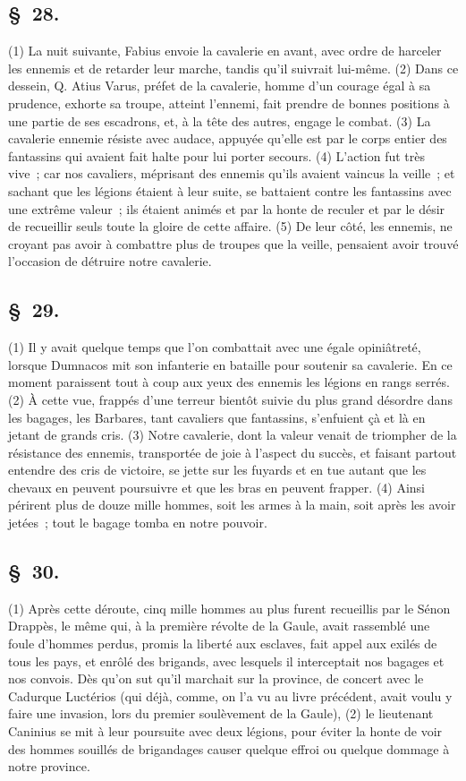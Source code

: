 \documentclass[french,twoside]{book} %
\begin{document}
\subsection[{§ 28.}]{ \textsc{§ 28.} }
\noindent (1) La nuit suivante, Fabius envoie la cavalerie en avant, avec ordre de harceler les ennemis et de retarder leur marche, tandis qu’il suivrait lui-même. (2) Dans ce dessein, Q. Atius Varus, préfet de la cavalerie, homme d’un courage égal à sa prudence, exhorte sa troupe, atteint l’ennemi, fait prendre de bonnes positions à une partie de ses escadrons, et, à la tête des autres, engage le combat. (3) La cavalerie ennemie résiste avec audace, appuyée qu’elle est par le corps entier des fantassins qui avaient fait halte pour lui porter secours. (4) L'action fut très vive ; car nos cavaliers, méprisant des ennemis qu’ils avaient vaincus la veille ; et sachant que les légions étaient à leur suite, se battaient contre les fantassins avec une extrême valeur ; ils étaient animés et par la honte de reculer et par le désir de recueillir seuls toute la gloire de cette affaire. (5) De leur côté, les ennemis, ne croyant pas avoir à combattre plus de troupes que la veille, pensaient avoir trouvé l’occasion de détruire notre cavalerie.
\subsection[{§ 29.}]{ \textsc{§ 29.} }
\noindent (1) Il y avait quelque temps que l’on combattait avec une égale opiniâtreté, lorsque Dumnacos mit son infanterie en bataille pour soutenir sa cavalerie. En ce moment paraissent tout à coup aux yeux des ennemis les légions en rangs serrés. (2) À cette vue, frappés d’une terreur bientôt suivie du plus grand désordre dans les bagages, les Barbares, tant cavaliers que fantassins, s’enfuient çà et là en jetant de grands cris. (3) Notre cavalerie, dont la valeur venait de triompher de la résistance des ennemis, transportée de joie à l’aspect du succès, et faisant partout entendre des cris de victoire, se jette sur les fuyards et en tue autant que les chevaux en peuvent poursuivre et que les bras en peuvent frapper. (4) Ainsi périrent plus de douze mille hommes, soit les armes à la main, soit après les avoir jetées ; tout le bagage tomba en notre pouvoir.
\subsection[{§ 30.}]{ \textsc{§ 30.} }
\noindent (1) Après cette déroute, cinq mille hommes au plus furent recueillis par le Sénon Drappès, le même qui, à la première révolte de la Gaule, avait rassemblé une foule d’hommes perdus, promis la liberté aux esclaves, fait appel aux exilés de tous les pays, et enrôlé des brigands, avec lesquels il interceptait nos bagages et nos convois. Dès qu’on sut qu’il marchait sur la province, de concert avec le Cadurque Luctérios (qui déjà, comme, on l’a vu au livre précédent, avait voulu y faire une invasion, lors du premier soulèvement de la Gaule), (2) le lieutenant Caninius se mit à leur poursuite avec deux légions, pour éviter la honte de voir des hommes souillés de brigandages causer quelque effroi ou quelque dommage à notre province.
\end{document}

